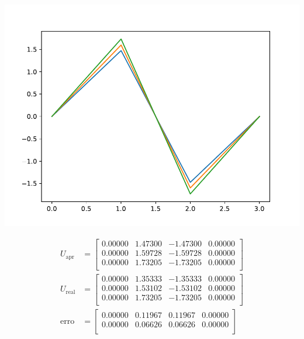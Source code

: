 \documentclass[a4paper, 11pt]{report}
\begin{document}
\begin{enumerate}[leftmargin=*]
        \begin{minipage}{0.35\columnwidth}
            \includegraphics[width=\columnwidth]{../edp/12.2_2.pdf}
        \end{minipage}
        \begin{minipage}{0.6\columnwidth}
            \begin{align*}
                U_{\text{apr}} &= 
                \begin{bmatrix}
                    0.00000 & 1.47300 & -1.47300 &  0.00000\\  
                    0.00000 & 1.59728 & -1.59728 &  0.00000\\  
                    0.00000 & 1.73205 & -1.73205 &  0.00000\\
                \end{bmatrix}\\
                U_{\text{real}} &=
                \begin{bmatrix}
                    0.00000 &  1.35333 &  -1.35333  & 0.00000\\  
                    0.00000 &  1.53102 &  -1.53102  & 0.00000\\  
                    0.00000 &  1.73205 &  -1.73205  & 0.00000\\ 
                \end{bmatrix}\\
                \text{erro} &= 
                \begin{bmatrix}
                    0.00000 & 0.11967 &  0.11967 &  0.00000\\  
                    0.00000 & 0.06626 &  0.06626 &  0.00000\\  

\end{bmatrix}
\end{align*}
\end{minipage}
\end{enumerate}
\end{document}
